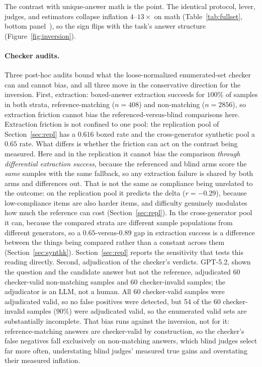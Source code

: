 \documentclass[11pt]{article}
\begin{document}
The contrast with unique-answer math is the point.
The identical protocol, lever, judges, and estimators collapse inflation $4$--$13\times$ on math (Table~\ref{tab:fullset}, bottom panel~\cite{companionA}), so the sign flips with the task's answer structure (Figure~\ref{fig:inversion}).

\paragraph{Checker audits.}
Three post-hoc audits bound what the loose-normalized enumerated-set checker can and cannot bias, and all three move in the conservative direction for the inversion.
First, extraction: boxed-answer extraction succeeds for $100\%$ of samples in both strata, reference-matching ($n{=}408$) and non-matching ($n{=}2856$), so extraction friction cannot bias the referenced-versus-blind comparisons here.
Extraction friction is not confined to one pool: the replication pool of Section~\ref{sec:repl} has a $0.616$ boxed rate and the cross-generator synthetic pool a $0.65$ rate.
What differs is whether the friction can act on the contrast being measured.
Here and in the replication it cannot bias the comparison \emph{through differential extraction success}, because the referenced and blind arms score the \emph{same} samples with the same fallback, so any extraction failure is shared by both arms and differences out.
That is not the same as compliance being unrelated to the outcome: on the replication pool it predicts the delta ($r{=}-0.29$), because low-compliance items are also harder items, and difficulty genuinely modulates how much the reference can cost (Section~\ref{sec:repl}).
In the cross-generator pool it can, because the compared strata are different sample populations from different generators, so a $0.65$-versus-$0.89$ gap in extraction success is a difference between the things being compared rather than a constant across them (Section~\ref{sec:synthk}).
Section~\ref{sec:repl} reports the sensitivity that tests this reading directly.
Second, adjudication of the checker's verdicts.
GPT-5.2, shown the question and the candidate answer but not the reference, adjudicated 60 checker-valid non-matching samples and 60 checker-invalid samples; the adjudicator is an LLM, not a human.
All 60 checker-valid samples were adjudicated valid, so no false positives were detected, but 54 of the 60 checker-invalid samples ($90\%$) were adjudicated valid, so the enumerated valid sets are substantially incomplete.
That bias runs against the inversion, not for it: reference-matching answers are checker-valid by construction, so the checker's false negatives fall exclusively on non-matching answers, which blind judges select far more often, understating blind judges' measured true gains and overstating their measured inflation.
\end{document}
